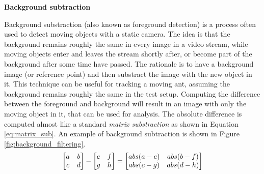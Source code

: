 \noindent \textbf{Background subtraction} \par
Background substraction (also known as foreground detection) is a process often used to detect moving objects with a static camera. The idea is that the background remains roughly the same in every image in a video stream, while moving objects enter and leaves the stream shortly after, or become part of the background after some time have passed. The rationale is to have a background image (or reference point) and then substract the image with the new object in it. This technique can be useful for tracking a moving ant, assuming the background remains roughly the same in the test setup. Computing the difference between the foreground and background will result in an image with only the moving object in it, that can be used for analysis. The absolute difference is computed almost like a standard \textit{matrix substraction} as shown in Equation \ref{eq:matrix_sub}. An example of background subtraction is shown in Figure \ref{fig:background_filtering}.\\

\begin{equation}
\setlength{\arraycolsep}{5pt}
 \begin{bmatrix}
  a & b \\
  c & d \\
 \end{bmatrix} - 
 \setlength{\arraycolsep}{5pt} 
 \begin{bmatrix}
  e & f \\
  g & h \\
 \end{bmatrix} =
 \setlength{\arraycolsep}{5pt} 
 \begin{bmatrix}
  abs(a-e) & abs(b-f) \\
  abs(c-g) & abs(d-h) \\
 \end{bmatrix}
 \label{eq:matrix_sub}
\end{equation}


